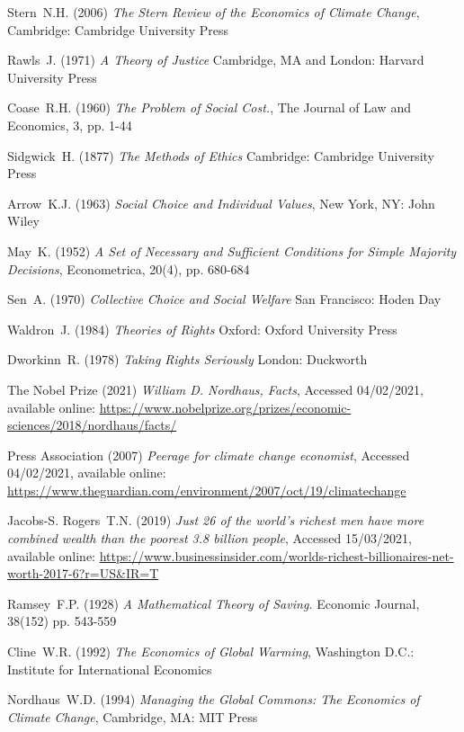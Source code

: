 \documentclass[11pt, oneside]{article}   	%
\begin{document}
\begin{thebibliography}{99}
 Stern~N.H. (2006)
\emph{The Stern Review of the Economics of Climate Change},
Cambridge: Cambridge University Press
	
 Rawls~J. (1971)
\emph{A Theory of Justice}
Cambridge, MA and London: Harvard University Press
	
 Coase~R.H. (1960)
\emph{The Problem of Social Cost.},
The Journal of Law and Economics, 3, pp. 1-44
	
 Sidgwick~H. (1877)
\emph{The Methods of Ethics}
Cambridge: Cambridge University Press
	
 Arrow~K.J. (1963)
\emph{Social Choice and Individual Values},
New York, NY: John Wiley
	
 May~K. (1952)
\emph{A Set of Necessary and Sufficient Conditions for Simple Majority Decisions},
Econometrica, 20(4), pp. 680-684
	
 Sen~A. (1970)
\emph{Collective Choice and Social Welfare}
San Francisco: Hoden Day
	
 Waldron~J. (1984)
\emph{Theories of Rights}
Oxford: Oxford University Press
	
 Dworkinn~R. (1978)
\emph{Taking Rights Seriously}
London: Duckworth
	
 The Nobel Prize (2021)
\emph{William D. Nordhaus, Facts},
Accessed 04/02/2021, available online: 
\url{https://www.nobelprize.org/prizes/economic-sciences/2018/nordhaus/facts/}
	
 Press Association (2007)
\emph{Peerage for climate change economist},
Accessed 04/02/2021, available online: 
\url{https://www.theguardian.com/environment/2007/oct/19/climatechange}
	
 Jacobs-S. Rogers~T.N. (2019)
\emph{Just 26 of the world's richest men have more combined wealth than the poorest 3.8 billion people},
Accessed 15/03/2021, available online: 
\url{https://www.businessinsider.com/worlds-richest-billionaires-net-worth-2017-6?r=US&IR=T}
	
 Ramsey~F.P. (1928)
\emph{A Mathematical Theory of Saving.}
Economic Journal, 38(152) pp. 543-559
	
 Cline~W.R. (1992)
\emph{The Economics of Global Warming},
Washington D.C.: Institute for International Economics
	
 Nordhaus~W.D. (1994)
\emph{Managing the Global Commons: The Economics of Climate Change},
Cambridge, MA: MIT Press
	

\end{thebibliography}
\end{document}
